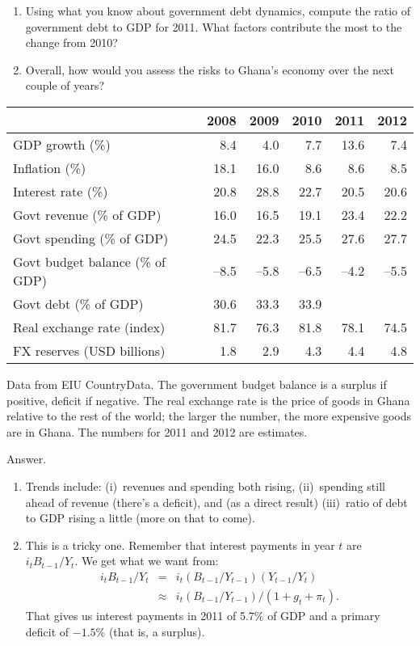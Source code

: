\begin{enumerate}
\begin{enumerate}
\item Using what you know about government debt dynamics,
compute the ratio of government debt to GDP for 2011.
What factors contribute the most to the change from 2010?

\item Overall, how would you assess the risks to Ghana's economy over
the next couple of years?
\end{enumerate}

{\small
\begin{tabular}{lrrrrr}
\toprule
        & 2008 & 2009 & 2010 & 2011 & 2012 \\
\midrule
GDP growth (\%) & 8.4 & 4.0 & 7.7 & 13.6 & 7.4 \\
Inflation (\%)  & 18.1 & 16.0 & 8.6 & 8.6 & 8.5 \\
Interest rate (\%) & 20.8 & 28.8 & 22.7 & 20.5 & 20.6  \\
Govt revenue (\% of GDP)  & 16.0 & 16.5 & 19.1 & 23.4 & 22.2 \\
Govt spending (\% of GDP) & 24.5 & 22.3 & 25.5 & 27.6 & 27.7 \\
Govt budget balance (\% of GDP) & --8.5 & --5.8 & --6.5& --4.2 & --5.5\\
Govt debt (\% of GDP) & 30.6 & 33.3 & 33.9 & {\bf } & {\bf } \\ %
Real exchange rate (index) & 81.7 & 76.3 & 81.8 & 78.1 & 74.5\\
FX reserves (USD billions) & 1.8 & 2.9 & 4.3 & 4.4 & 4.8 \\
\bottomrule
\end{tabular}
}

\medskip
Data from EIU CountryData.
The government budget balance is a surplus if positive, deficit if negative.
The real exchange rate is the price of goods in Ghana relative to the rest
of the world;
the larger the number, the more expensive goods are in Ghana.
The numbers for 2011 and 2012 are estimates.

Answer.
\begin{enumerate}
\item Trends include:
(i)~revenues and spending both rising,
(ii)~spending still ahead of revenue (there's a deficit),
and (as a direct result)
(iii)~ratio of debt to GDP rising a little
(more on that to come).

\item This is a tricky one.  
Remember that interest payments in year $t$ are $ i_t B_{t-1}/Y_t$.
We get what we want from:
\begin{eqnarray*}
    i_t B_{t-1}/ Y_{t} &=& i_t (B_{t-1}/ Y_{t-1}) (Y_{t-1}/ Y_{t}) \\
           &\approx&  i_t (B_{t-1}/Y_{t-1}) /(1+g_t + \pi_t) .
\end{eqnarray*}
That gives us interest payments in 2011 of 5.7\% of GDP and
a primary deficit of $-1.5$\% (that is, a surplus).


\end{enumerate}
\end{enumerate}
